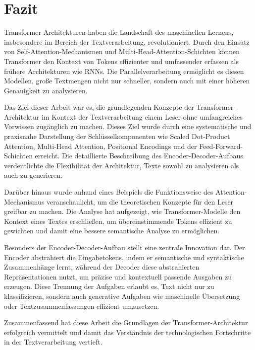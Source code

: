 \chapter{Fazit}

Transformer-Architekturen haben die Landschaft des maschinellen Lernens, insbesondere im Bereich der Textverarbeitung, revolutioniert. 
Durch den Einsatz von Self-Attention-Mechanismen und Multi-Head-Attention-Schichten können Transformer den Kontext von Tokens effizienter und umfassender erfassen als frühere Architekturen wie RNNs. 
Die Parallelverarbeitung ermöglicht es diesen Modellen, große Textmengen nicht nur schneller, sondern auch mit einer höheren Genauigkeit zu analysieren.

Das Ziel dieser Arbeit war es, die grundlegenden Konzepte der Transformer-Architektur im Kontext der Textverarbeitung einem Leser ohne umfangreiches Vorwissen zugänglich zu machen. 
Dieses Ziel wurde durch eine systematische und praxisnahe Darstellung der Schlüsselkomponenten wie Scaled Dot-Product Attention, Multi-Head Attention, Positional Encodings und der Feed-Forward-Schichten erreicht. 
Die detaillierte Beschreibung des Encoder-Decoder-Aufbaus verdeutlichte die Flexibilität der Architektur, Texte sowohl zu analysieren als auch zu generieren.

Darüber hinaus wurde anhand eines Beispiels die Funktionsweise des Attention-Mechanismus veranschaulicht, um die theoretischen Konzepte für den Leser greifbar zu machen. 
Die Analyse hat aufgezeigt, wie Transformer-Modelle den Kontext eines Textes erschließen, um übereinstimmende Tokens effizient zu gewichten und damit eine bessere semantische Analyse zu ermöglichen.

Besonders der Encoder-Decoder-Aufbau stellt eine zentrale Innovation dar. 
Der Encoder abstrahiert die Eingabetokens, indem er semantische und syntaktische Zusammenhänge lernt, während der Decoder diese abstrahierten Repräsentationen nutzt, um präzise und kontextuell passende Ausgaben zu erzeugen. 
Diese Trennung der Aufgaben erlaubt es, Text nicht nur zu klassifizieren, sondern auch generative Aufgaben wie maschinelle Übersetzung oder Textzusammenfassungen effizient umzusetzen.

Zusammenfassend hat diese Arbeit die Grundlagen der Transformer-Architektur erfolgreich vermittelt und damit das Verständnis der technologischen Fortschritte in der Textverarbeitung vertieft.

